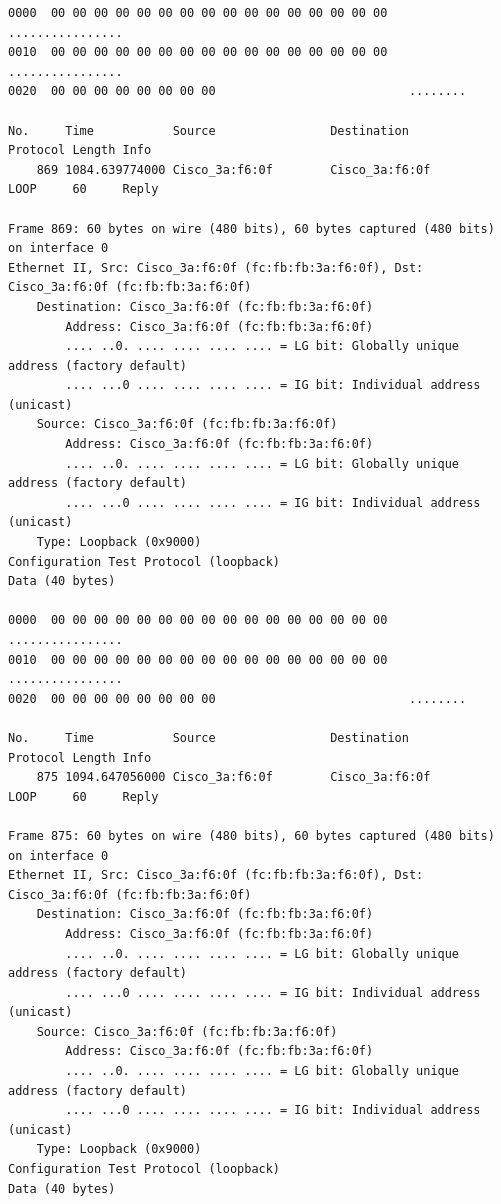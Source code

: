 \documentclass[a4paper,11pt]{article}
\begin{document}
\begin{lstlisting}
0000  00 00 00 00 00 00 00 00 00 00 00 00 00 00 00 00   ................
0010  00 00 00 00 00 00 00 00 00 00 00 00 00 00 00 00   ................
0020  00 00 00 00 00 00 00 00                           ........

No.     Time           Source                Destination           Protocol Length Info
    869 1084.639774000 Cisco_3a:f6:0f        Cisco_3a:f6:0f        LOOP     60     Reply

Frame 869: 60 bytes on wire (480 bits), 60 bytes captured (480 bits) on interface 0
Ethernet II, Src: Cisco_3a:f6:0f (fc:fb:fb:3a:f6:0f), Dst: Cisco_3a:f6:0f (fc:fb:fb:3a:f6:0f)
    Destination: Cisco_3a:f6:0f (fc:fb:fb:3a:f6:0f)
        Address: Cisco_3a:f6:0f (fc:fb:fb:3a:f6:0f)
        .... ..0. .... .... .... .... = LG bit: Globally unique address (factory default)
        .... ...0 .... .... .... .... = IG bit: Individual address (unicast)
    Source: Cisco_3a:f6:0f (fc:fb:fb:3a:f6:0f)
        Address: Cisco_3a:f6:0f (fc:fb:fb:3a:f6:0f)
        .... ..0. .... .... .... .... = LG bit: Globally unique address (factory default)
        .... ...0 .... .... .... .... = IG bit: Individual address (unicast)
    Type: Loopback (0x9000)
Configuration Test Protocol (loopback)
Data (40 bytes)

0000  00 00 00 00 00 00 00 00 00 00 00 00 00 00 00 00   ................
0010  00 00 00 00 00 00 00 00 00 00 00 00 00 00 00 00   ................
0020  00 00 00 00 00 00 00 00                           ........

No.     Time           Source                Destination           Protocol Length Info
    875 1094.647056000 Cisco_3a:f6:0f        Cisco_3a:f6:0f        LOOP     60     Reply

Frame 875: 60 bytes on wire (480 bits), 60 bytes captured (480 bits) on interface 0
Ethernet II, Src: Cisco_3a:f6:0f (fc:fb:fb:3a:f6:0f), Dst: Cisco_3a:f6:0f (fc:fb:fb:3a:f6:0f)
    Destination: Cisco_3a:f6:0f (fc:fb:fb:3a:f6:0f)
        Address: Cisco_3a:f6:0f (fc:fb:fb:3a:f6:0f)
        .... ..0. .... .... .... .... = LG bit: Globally unique address (factory default)
        .... ...0 .... .... .... .... = IG bit: Individual address (unicast)
    Source: Cisco_3a:f6:0f (fc:fb:fb:3a:f6:0f)
        Address: Cisco_3a:f6:0f (fc:fb:fb:3a:f6:0f)
        .... ..0. .... .... .... .... = LG bit: Globally unique address (factory default)
        .... ...0 .... .... .... .... = IG bit: Individual address (unicast)
    Type: Loopback (0x9000)
Configuration Test Protocol (loopback)
Data (40 bytes)


\end{lstlisting}
\end{document}
